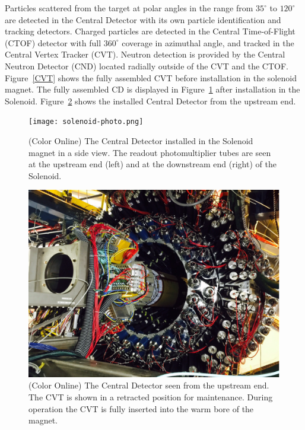\documentclass[final,3p,twocolumn]{elsarticle}
\begin{document}
Particles scattered from the target at polar angles in the range from $35^\circ$  to $120^\circ$ are detected in the
Central Detector with its own particle identification and tracking detectors. Charged particles are detected in the
Central Time-of-Flight (CTOF) detector with full $360^\circ$ coverage in azimuthal angle, and tracked in the Central
Vertex Tracker (CVT). Neutron detection is provided by the Central Neutron Detector (CND) located radially outside
of the CVT and the CTOF.  Figure~\ref{CVT} shows the fully assembled CVT before installation in the solenoid magnet.
The fully assembled CD is displayed in  Figure~\ref{CDinSol} after installation in the Solenoid.  Figure~\ref{CDback}
shows the installed Central Detector from the upstream end.


\begin{figure}[htbp!]
\centerline{\texttt{[image: solenoid-photo.png]}}
\caption{(Color Online) The Central Detector installed in the Solenoid magnet in a side view. The readout photomultiplier tubes are
seen at the upstream end (left) and at the downstream end (right) of the Solenoid.}
\label{CDinSol}
\end{figure}

\begin{figure}[htbp!]
\centerline{\includegraphics[width=1.3\columnwidth,angle=90]{CLAS12-CD.png}}
\caption{(Color Online) The Central Detector seen from the upstream end. The CVT is shown in a retracted position for
maintenance. During operation the CVT is fully inserted into the warm bore of the magnet.}
\label{CDback}
\end{figure}
\end{document}
